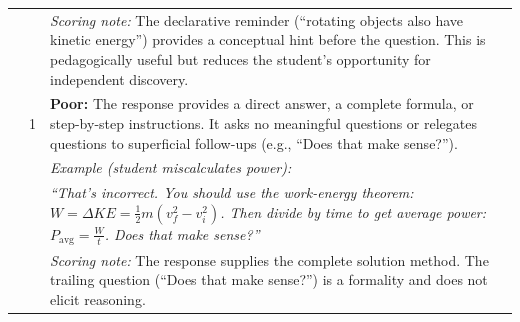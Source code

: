 \begin{longtable}{@{}p{3cm} p{1cm} p{10cm}@{}}
& & \textit{Scoring note:} The declarative reminder (``rotating objects also have kinetic energy'') provides a conceptual hint before the question. This is pedagogically useful but reduces the student's opportunity for independent discovery. \\
\addlinespace
& 1 & \textbf{Poor:} The response provides a direct answer, a complete formula, or step-by-step instructions. It asks no meaningful questions or relegates questions to superficial follow-ups (e.g., ``Does that make sense?''). \\
& & \textit{Example (student miscalculates power):} \\
& & \textit{``That's incorrect. You should use the work-energy theorem: $W = \Delta KE = \frac{1}{2} m (v_f^2 - v_i^2)$. Then divide by time to get average power: $P_{\text{avg}} = \frac{W}{t}$. Does that make sense?''} \\
& & \textit{Scoring note:} The response supplies the complete solution method. The trailing question (``Does that make sense?'') is a formality and does not elicit reasoning. \\
\midrule


\end{longtable}
